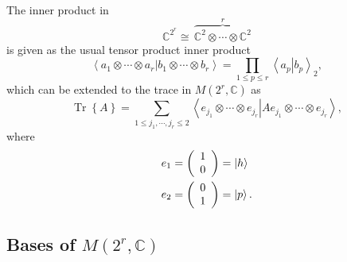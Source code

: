 \documentclass[aps,preprint]{revtex4}%
\begin{document}
The inner product in
\begin{equation}
\mathbb{C}^{2^{r}}\cong\,\overset{r}{\overbrace{\mathbb{C}^{2}\otimes
\cdots\otimes\mathbb{C}^{2}}}%
\end{equation}
is given as the usual tensor product inner product
\begin{equation}
\left\langle a_{1}\otimes\cdots\otimes a_{r}\left\vert b_{1}\otimes
\cdots\otimes b_{r}\right.  \right\rangle =%
{\displaystyle\prod\limits_{1\leq p\leq r}}
\left\langle a_{p}\left\vert b_{p}\right.  \right\rangle _{2},
\end{equation}
which can be extended to the trace in $M\left(  2^{r},\mathbb{C}\right)  $ as
\begin{equation}
\operatorname*{Tr}\left\{  A\right\}  =\sum_{1\leq j_{1},\cdots,j_{r}\leq
2}\left\langle e_{j_{1}}\otimes\cdots\otimes e_{j_{r}}\left\vert Ae_{j_{1}%
}\otimes\cdots\otimes e_{j_{r}}\right.  \right\rangle ,
\end{equation}
where
\begin{align}
e_{1}  &  =\left(
\begin{array}
[c]{c}%
1\\
0
\end{array}
\right)  =\left\vert h\right\rangle \\
e_{2}  &  =\left(
\begin{array}
[c]{c}%
0\\
1
\end{array}
\right)  =\left\vert p\right\rangle .
\end{align}


\subsection{Bases of $M\left(  2^{r},\mathbb{C}\right)  $}
\end{document}
